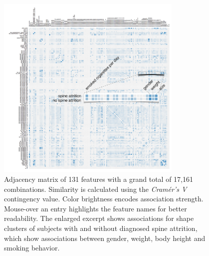 \documentclass[journal]{style/vgtc} 			          %
\begin{document}
\begin{figure}[htb]
 \centering
 \includegraphics[width=3.5in]{figures/similarity_matrix}
 \caption{Adjacency matrix of 131 features with a grand total of 17,161 combinations.
 Similarity is calculated using the \emph{Cram\'{e}r's V} contingency value.
 Color brightness encodes association strength.
 Mouse-over an entry highlights the feature names for better readability.
 The enlarged excerpt shows associations for shape clusters of subjects with and without diagnosed spine attrition, which show associations between gender, weight, body height and smoking behavior.
 }
 \label{fig:similarity}
\end{figure}
\end{document}
